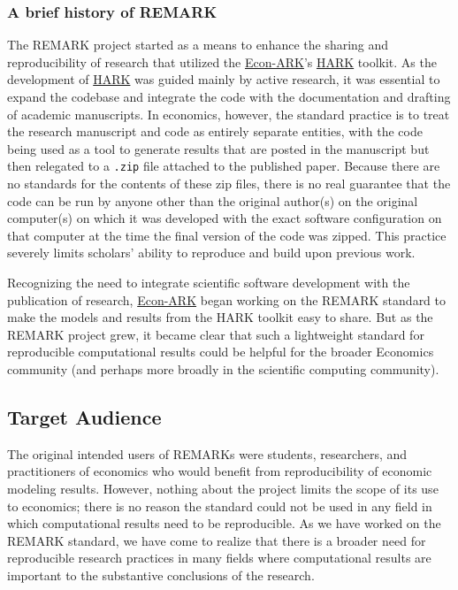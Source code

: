 \documentclass{article}
\begin{document}
\subsubsection{A brief history of REMARK}

The REMARK project started as a means to enhance the sharing and reproducibility of research that utilized the \href{https://econ-ark.org}{Econ-ARK}'s \href{https://docs.econ-ark.org}{HARK} toolkit. As the development of \href{https://github/econ-ark/HARK}{HARK} was guided mainly by active research, it was essential to expand the codebase and integrate the code with the documentation and drafting of academic manuscripts. In economics, however, the standard practice is to treat the research manuscript and code as entirely separate entities, with the code being used as a tool to generate results that are posted in the manuscript but then relegated to a \texttt{.zip} file attached to the published paper. Because there are no standards for the contents of these zip files, there is no real guarantee that the code can be run by anyone other than the original author(s) on the original computer(s) on which it was developed with the exact software configuration on that computer at the time the final version of the code was zipped. This practice severely limits scholars' ability to reproduce and build upon previous work.

Recognizing the need to integrate scientific software development with the publication of research, \href{https://econ-ark.org}{Econ-ARK} began working on the REMARK standard to make the models and results from the HARK toolkit easy to share. But as the REMARK project grew, it became clear that such a lightweight standard for reproducible computational results could be helpful for the broader Economics community (and perhaps more broadly in the scientific computing community).

\subsection{Target Audience}


The original intended users of REMARKs were students, researchers, and practitioners of economics who would benefit from reproducibility of economic modeling results. However, nothing about the project limits the scope of its use to economics; there is no reason the standard could not be used in any field in which computational results need to be reproducible. As we have worked on the REMARK standard, we have come to realize that there is a broader need for reproducible research practices in many fields where computational results are important to the substantive conclusions of the research.
\end{document}
